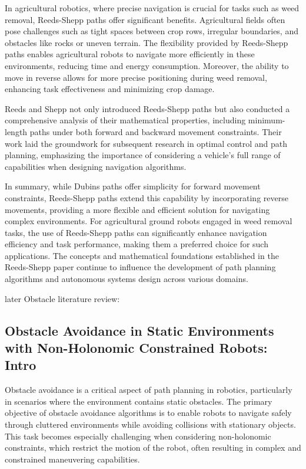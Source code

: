 \vspace*{6mm}

In agricultural robotics, where precise navigation is crucial for tasks such as weed removal, Reeds-Shepp paths offer significant benefits. Agricultural fields often pose challenges such as tight spaces between crop rows, irregular boundaries, and obstacles like rocks or uneven terrain. The flexibility provided by Reeds-Shepp paths enables agricultural robots to navigate more efficiently in these environments, reducing time and energy consumption. Moreover, the ability to move in reverse allows for more precise positioning during weed removal, enhancing task effectiveness and minimizing crop damage.

\vspace*{6mm}

Reeds and Shepp not only introduced Reeds-Shepp paths but also conducted a comprehensive analysis of their mathematical properties, including minimum-length paths under both forward and backward movement constraints. Their work laid the groundwork for subsequent research in optimal control and path planning, emphasizing the importance of considering a vehicle's full range of capabilities when designing navigation algorithms.

\vspace*{6mm}

In summary, while Dubins paths offer simplicity for forward movement constraints, Reeds-Shepp paths extend this capability by incorporating reverse movements, providing a more flexible and efficient solution for navigating complex environments. For agricultural ground robots engaged in weed removal tasks, the use of Reeds-Shepp paths can significantly enhance navigation efficiency and task performance, making them a preferred choice for such applications. The concepts and mathematical foundations established in the Reeds-Shepp paper continue to influence the development of path planning algorithms and autonomous systems design across various domains.


\newpage



later Obstacle literature review:

\subsection{Obstacle Avoidance in Static Environments with Non-Holonomic Constrained Robots: Intro}


Obstacle avoidance is a critical aspect of path planning in robotics, particularly in scenarios where the environment contains static obstacles. The primary objective of obstacle avoidance algorithms is to enable robots to navigate safely through cluttered environments while avoiding collisions with stationary objects. This task becomes especially challenging when considering non-holonomic constraints, which restrict the motion of the robot, often resulting in complex and constrained maneuvering capabilities.

